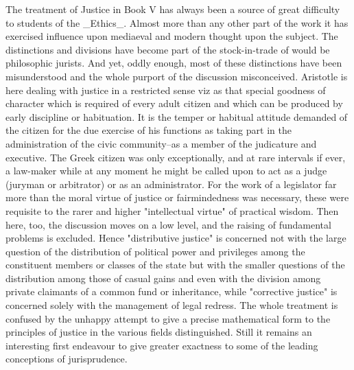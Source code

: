 The treatment of Justice in Book V has always been a source of great
difficulty to students of the _Ethics_. Almost more than any other part
of the work it has exercised influence upon mediaeval and modern thought
upon the subject. The distinctions and divisions have become part of the
stock-in-trade of would be philosophic jurists. And yet, oddly enough,
most of these distinctions have been misunderstood and the whole purport
of the discussion misconceived. Aristotle is here dealing with justice
in a restricted sense viz as that special goodness of character which
is required of every adult citizen and which can be produced by early
discipline or habituation. It is the temper or habitual attitude
demanded of the citizen for the due exercise of his functions as taking
part in the administration of the civic community--as a member of the
judicature and executive. The Greek citizen was only exceptionally, and
at rare intervals if ever, a law-maker while at any moment he might
be called upon to act as a judge (juryman or arbitrator) or as an
administrator. For the work of a legislator far more than the moral
virtue of justice or fairmindedness was necessary, these were requisite
to the rarer and higher "intellectual virtue" of practical wisdom. Then
here, too, the discussion moves on a low level, and the raising of
fundamental problems is excluded. Hence "distributive justice" is
concerned not with the large question of the distribution of political
power and privileges among the constituent members or classes of the
state but with the smaller questions of the distribution among those of
casual gains and even with the division among private claimants of a
common fund or inheritance, while "corrective justice" is concerned
solely with the management of legal redress. The whole treatment is
confused by the unhappy attempt to give a precise mathematical form to
the principles of justice in the various fields distinguished. Still it
remains an interesting first endeavour to give greater exactness to some
of the leading conceptions of jurisprudence.

